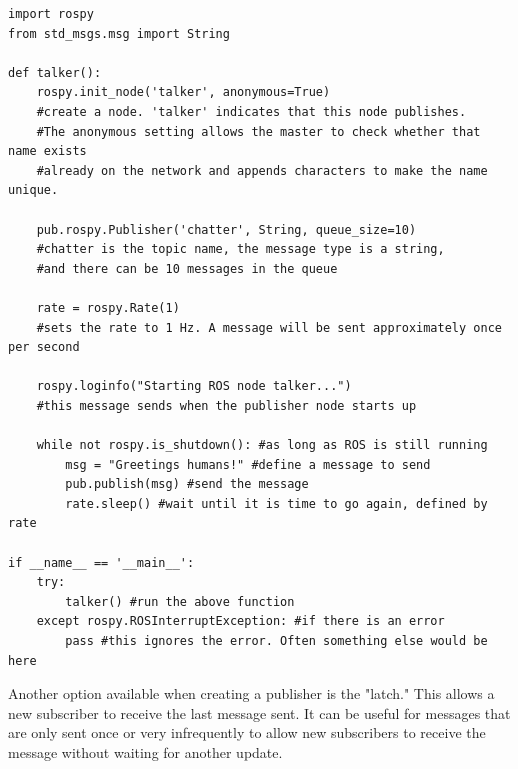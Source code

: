 \documentclass[twoside]{article}
\begin{document}
\begin{verbatim}
import rospy
from std_msgs.msg import String

def talker():
    rospy.init_node('talker', anonymous=True)
    #create a node. 'talker' indicates that this node publishes.
    #The anonymous setting allows the master to check whether that name exists
    #already on the network and appends characters to make the name unique.

    pub.rospy.Publisher('chatter', String, queue_size=10)
    #chatter is the topic name, the message type is a string,
    #and there can be 10 messages in the queue

    rate = rospy.Rate(1)
    #sets the rate to 1 Hz. A message will be sent approximately once per second

    rospy.loginfo("Starting ROS node talker...")
    #this message sends when the publisher node starts up

    while not rospy.is_shutdown(): #as long as ROS is still running
        msg = "Greetings humans!" #define a message to send
        pub.publish(msg) #send the message
        rate.sleep() #wait until it is time to go again, defined by rate

if __name__ == '__main__':
    try:
        talker() #run the above function
    except rospy.ROSInterruptException: #if there is an error
        pass #this ignores the error. Often something else would be here

\end{verbatim}

Another option available when creating a publisher is the "latch." This allows a new subscriber to receive the last message sent. It can be useful for messages that are only sent once or very infrequently to allow new subscribers to receive the message without waiting for another update.
\end{document}
